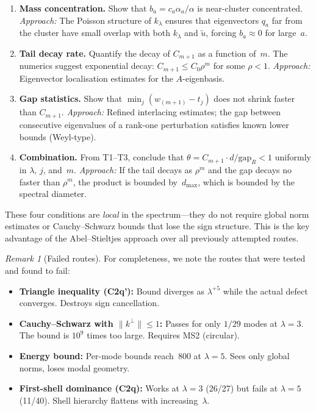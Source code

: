 \documentclass[12pt,a4paper]{article}
\theoremstyle{definition}
\theoremstyle{remark}
\newtheorem{remark}[theorem]{Remark}
\newcommand{\norm}[1]{\| #1 \|}
\newcommand{\utilde}{\tilde{u}}
\begin{document}
\begin{enumerate}[label=\textbf{T\arabic*}]
\item \textbf{Mass concentration.}
  Show that $b_a = c_a \alpha_a / \alpha$ is near-cluster concentrated.
  \emph{Approach:} The Poisson structure of $k_\lambda$ ensures that
  eigenvectors $q_a$ far from the cluster have small overlap with
  both $k_\lambda$ and $\utilde$, forcing $b_a \approx 0$ for large~$a$.

\item \textbf{Tail decay rate.}
  Quantify the decay of $C_{m+1}$ as a function of~$m$.
  The numerics suggest exponential decay: $C_{m+1} \leq C_0 \rho^m$
  for some $\rho < 1$.
  \emph{Approach:} Eigenvector localisation estimates for the
  $A$-eigenbasis.

\item \textbf{Gap statistics.}
  Show that $\min_j (w_{(m+1)} - t_j)$ does not shrink faster than
  $C_{m+1}$.
  \emph{Approach:} Refined interlacing estimates; the gap between
  consecutive eigenvalues of a rank-one perturbation satisfies
  known lower bounds (Weyl-type).

\item \textbf{Combination.}
  From T1--T3, conclude that $\theta = C_{m+1} \cdot d / \text{gap}_R < 1$
  uniformly in $\lambda$, $j$, and~$m$.
  \emph{Approach:} If the tail decays as $\rho^m$ and the gap decays
  no faster than $\rho^m$, the product is bounded by~$d_{\max}$, which
  is bounded by the spectral diameter.
\end{enumerate}

These four conditions are \emph{local} in the spectrum---they do not
require global norm estimates or Cauchy--Schwarz bounds that lose the
sign structure.
This is the key advantage of the Abel--Stieltjes approach over
all previously attempted routes.

\begin{remark}[Failed routes]
For completeness, we note the routes that were tested and found to
fail:
\begin{itemize}
\item \textbf{Triangle inequality (C2q'):} Bound diverges as
  $\lambda^{+5}$ while the actual defect converges.
  Destroys sign cancellation.
\item \textbf{Cauchy--Schwarz with $\norm{k^\perp} \leq 1$:}
  Passes for only $1/29$ modes at $\lambda = 3$.
  The bound is $10^9$ times too large.
  Requires MS2 (circular).
\item \textbf{Energy bound:} Per-mode bounds reach~$800$ at $\lambda = 5$.
  Sees only global norms, loses modal geometry.
\item \textbf{First-shell dominance (C2q):} Works at $\lambda = 3$
  (26/27) but fails at $\lambda = 5$ (11/40).
  Shell hierarchy flattens with increasing~$\lambda$.
\end{itemize}
\end{remark}
\end{document}
